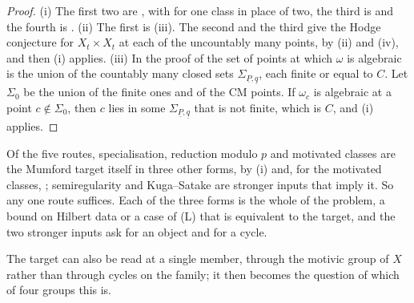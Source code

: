 \begin{proof}
(i) The first two are , with 
for one class in place of two, the third is  and the
fourth is . (ii) The first is
(iii). The second and the third give the Hodge
conjecture for $X_{t}\times X_{t}$ at each of the uncountably many points, by
(ii) and (iv), and then (i) applies.
(iii) In the proof of  the set of points at which
$\omega$ is algebraic is the union of the countably many closed sets
$\Sigma_{\underline{P},\underline{q}}$, each finite or equal to $C$. Let
$\Sigma_{0}$ be the union of the finite ones and of the CM points. If
$\omega_{c}$ is algebraic at a point $c\notin\Sigma_{0}$, then $c$ lies in
some $\Sigma_{\underline{P},\underline{q}}$ that is not finite, which is $C$,
and (i) applies.
\end{proof}

\begin{remark}\label{rem:mumfordneeded}
Of the five routes, specialisation, reduction modulo $p$ and motivated
classes are the Mumford target itself in three other forms, by
(i) and, for the motivated classes,
; semiregularity and Kuga--Satake are stronger inputs
that imply it. So any one route suffices. Each of the three
forms is the whole of the problem, a bound on Hilbert data or a case of
\textup{(L)} that is equivalent to the target, and the two stronger inputs
ask for an object and for a cycle.
\end{remark}

The target can also be read at a single member, through the motivic group of
$X$ rather than through cycles on the family; it then becomes the question of
which of four groups this is.

